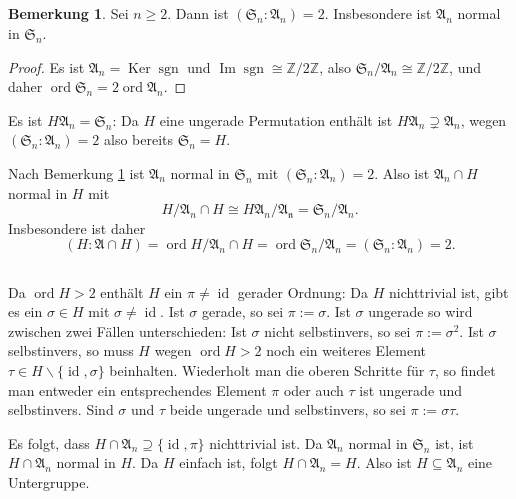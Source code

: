 \documentclass[a4paper,10pt]{article}
\theoremstyle{definition}
\newtheorem{bem}[beh]{Bemerkung}
\newcommand{\Z}{\mathbb{Z}}
\newcommand{\Sn}{\mathfrak{S}}
\newcommand{\mf}[1]{\mathfrak{#1}}
\newcommand{\id}{\operatorname{id}}
\newcommand{\ord}{\operatorname{ord}}
\newcommand{\sgn}{\operatorname{sgn}}
\newcommand{\Img}{\operatorname{Im}}
\newcommand{\Ker}{\operatorname{Ker}}
\begin{document}
\subsection{}

\begin{bem}\label{bem: index A_n}
 Sei $n \geq 2$. Dann ist $(\Sn_n : \mf{A}_n) = 2$. Insbesondere ist $\mf{A}_n$ normal in $\Sn_n$.
\end{bem}
\begin{proof}
 Es ist $\mf{A}_n = \Ker \sgn$ und $\Img \sgn \cong \Z/2\Z$, also $\Sn_n / \mf{A}_n \cong \Z/2\Z$, und daher \mbox{$\ord \Sn_n = 2 \ord \mf{A}_n$}.
\end{proof}

Es ist $H \mf{A}_n = \Sn_n$: Da $H$ eine ungerade Permutation enthält ist $H \mf{A}_n \supsetneq \mf{A}_n$, wegen $(\Sn_n : \mf{A}_n) = 2$ also bereits $\Sn_n = H$.

Nach Bemerkung \ref{bem: index A_n} ist $\mf{A}_n$ normal in $\Sn_n$ mit $(\Sn_n : \mf{A}_n) = 2$. Also ist $\mf{A}_n \cap H$ normal in $H$ mit
\[
 H / \mf{A}_n \cap H \cong H\mf{A}_n / \mf{A_n} = \Sn_n / \mf{A}_n.
\]
Insbesondere ist daher
\[
 (H : \mf{A} \cap H) = \ord H / \mf{A}_n \cap H = \ord \Sn_n / \mf{A}_n = (\Sn_n : \mf{A}_n) = 2.
\]


\subsection{}
Da $\ord H > 2$ enthält $H$ ein $\pi \neq \id$ gerader Ordnung: Da $H$ nichttrivial ist, gibt es ein $\sigma \in H$ mit $\sigma \neq \id$. Ist $\sigma$ gerade, so sei $\pi := \sigma$. Ist $\sigma$ ungerade so wird zwischen zwei Fällen unterschieden: Ist $\sigma$ nicht selbstinvers, so sei $\pi := \sigma^2$. Ist $\sigma$ selbstinvers, so muss $H$ wegen $\ord H > 2$ noch ein weiteres Element $\tau \in H \smallsetminus \{\id,\sigma\}$ beinhalten. Wiederholt man die oberen Schritte für $\tau$, so findet man entweder ein entsprechendes Element $\pi$ oder auch $\tau$ ist ungerade und selbstinvers. Sind $\sigma$ und $\tau$ beide ungerade und selbstinvers, so sei $\pi := \sigma \tau$.

Es folgt, dass $H \cap \mf{A}_n \supseteq \{\id, \pi\}$ nichttrivial ist. Da $\mf{A}_n$ normal in $\Sn_n$ ist, ist $H \cap \mf{A}_n$ normal in $H$. Da $H$ einfach ist, folgt $H \cap \mf{A}_n = H$. Also ist $H \subseteq \mf{A}_n$ eine Untergruppe.





\section{}
\end{document}
